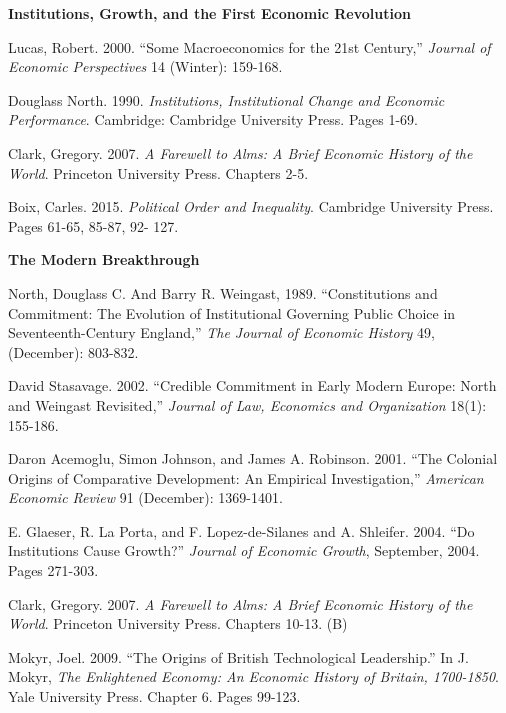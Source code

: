 \documentclass[letterpaper]{article}
\renewenvironment{itemize}{
  \begin{list}{}{
    \setlength{\leftmargin}{1.5em}
  }
}{
  \end{list}
}
\begin{document}
\begin{enumerate}

\item {\bf Institutions, Growth, and the First Economic Revolution}
	\begin{itemize}
		\item[$\bullet$] Lucas, Robert. 2000. ``Some Macroeconomics for the 21st Century,'' \emph{Journal of Economic Perspectives} 14 (Winter): 159-168.
		\item[$\bullet$]Douglass North. 1990. \emph{Institutions, Institutional Change and Economic Performance}. Cambridge: Cambridge University Press. Pages 1-69.
		\item[$\bullet$]Clark, Gregory. 2007. \emph{A Farewell to Alms: A Brief Economic History of the World}. Princeton University Press. Chapters 2-5.
		\item[$\bullet$]Boix, Carles. 2015. \emph{Political Order and Inequality}. Cambridge University Press. Pages 61-65, 85-87, 92- 127.
	\end{itemize}


\item {\bf The Modern Breakthrough}

	\begin{itemize}
		\item[$\bullet$] North, Douglass C. And Barry R. Weingast, 1989. ``Constitutions and Commitment: The Evolution of Institutional Governing Public Choice in Seventeenth-Century England,'' \emph{The Journal of Economic History} 49, (December): 803-832.
		\item[$\bullet$] David Stasavage. 2002. ``Credible Commitment in Early Modern Europe: North and Weingast Revisited,'' \emph{Journal of Law, Economics and Organization} 18(1): 155-186.
		\item[$\bullet$] Daron Acemoglu, Simon Johnson, and James A. Robinson. 2001. ``The Colonial Origins of Comparative Development: An Empirical Investigation,'' \emph{American Economic Review} 91 (December): 1369-1401.
		\item[$\bullet$] E. Glaeser, R. La Porta, and F. Lopez-de-Silanes and A. Shleifer. 2004. ``Do Institutions Cause Growth?'' \emph{Journal of Economic Growth}, September, 2004. Pages 271-303.
		\item[$\bullet$] Clark, Gregory. 2007. \emph{A Farewell to Alms: A Brief Economic History of the World}. Princeton University Press. Chapters 10-13. (B)
		\item[$\bullet$] Mokyr, Joel. 2009. ``The Origins of British Technological Leadership.'' In J. Mokyr, \emph{The Enlightened Economy: An Economic History of Britain, 1700-1850}. Yale University Press. Chapter 6. Pages 99-123.
	\end{itemize}



\end{enumerate}
\end{document}

